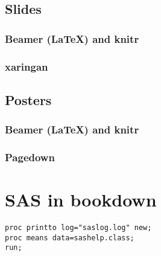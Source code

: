 \documentclass[]{book}
\begin{document}
\hypertarget{slides}{%
\section{Slides}\label{slides}}

\hypertarget{beamer-latex-and-knitr}{%
\subsection{Beamer (LaTeX) and knitr}\label{beamer-latex-and-knitr}}

\hypertarget{xaringan}{%
\subsection{xaringan}\label{xaringan}}

\hypertarget{posters}{%
\section{Posters}\label{posters}}

\hypertarget{beamer-latex-and-knitr-1}{%
\subsection{Beamer (LaTeX) and knitr}\label{beamer-latex-and-knitr-1}}

\hypertarget{pagedown}{%
\subsection{Pagedown}\label{pagedown}}

\hypertarget{sas-in-bookdown}{%
\chapter{SAS in bookdown}\label{sas-in-bookdown}}

\begin{verbatim}
proc printto log="saslog.log" new;
proc means data=sashelp.class;
run;
\end{verbatim}
\end{document}
